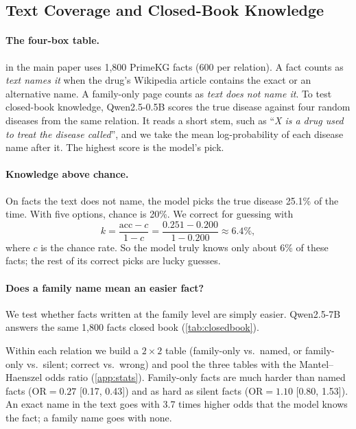 \subsection{Text Coverage and Closed-Book Knowledge}

\paragraph{The four-box table.}
 in the main paper uses 1,800 PrimeKG facts (600 per relation). A fact counts as \emph{text names it} when the drug's Wikipedia article contains the exact or an alternative name. A family-only page counts as \emph{text does not name it}. To test closed-book knowledge, Qwen2.5-0.5B scores the true disease against four random diseases from the same relation. It reads a short stem, such as ``\emph{X is a drug used to treat the disease called}'', and we take the mean log-probability of each disease name after it. The highest score is the model's pick.

\paragraph{Knowledge above chance.}
On facts the text does not name, the model picks the true disease 25.1\% of the time. With five options, chance is 20\%. We correct for guessing with
\begin{equation}
k=\frac{\mathrm{acc}-c}{1-c}=\frac{0.251-0.200}{1-0.200}\approx 6.4\%,
\end{equation}
where $c$ is the chance rate. So the model truly knows only about 6\% of these facts; the rest of its correct picks are lucky guesses.

\paragraph{Does a family name mean an easier fact?}
We test whether facts written at the family level are simply easier. Qwen2.5-7B answers the same 1,800 facts closed book (\cref{tab:closedbook}).


 Within each relation we build a $2\times2$ table (family-only vs.\ named, or family-only vs.\ silent; correct vs.\ wrong) and pool the three tables with the Mantel--Haenszel odds ratio (\cref{app:stats}). Family-only facts are much harder than named facts ($\mathrm{OR}=0.27$ [0.17, 0.43]) and as hard as silent facts ($\mathrm{OR}=1.10$ [0.80, 1.53]). An exact name in the text goes with 3.7 times higher odds that the model knows the fact; a family name goes with none.
